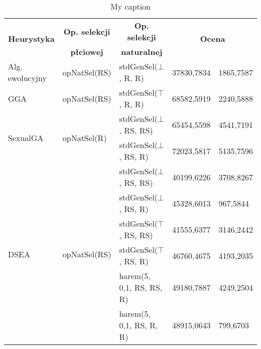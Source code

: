 \documentclass[./FM_mgr.tex]{subfiles}
\begin{document}
\begin{table}[h]
	\centering
	\caption{My caption}
	\label{my-label}
	\begin{tabular}{|l|l|l|r@{$\pm$}l|}
		\hline
		\multicolumn{1}{|c|}{\multirow{2}{*}{{\bf Heurystyka}}} & \multicolumn{1}{c|}{{\bf Op. selekcji}} & \multicolumn{1}{c|}{{\bf Op. selekcji}} & \multicolumn{2}{c|}{\multirow{2}{*}{{\bf Ocena}}} \\
		\multicolumn{1}{|c|}{}                                  & \multicolumn{1}{c|}{{\bf płciowej}}          & \multicolumn{1}{c|}{{\bf naturalnej}}        & \multicolumn{2}{c|}{}                             \\ \hline
		Alg. ewolucyjny                    & opNatSel(RS)                                          & stdGenSel($\bot$, R, R)                                 & 37830,7834      & 1865,7587      \\ \hline
		GGA                                    & opNatSel(RS)                                          & stdGenSel($\top$, R, R)                                 & 68582,5919      & 2240,5888      \\ \hline
		\multirow{2}{*}{SexualGA}              & \multirow{2}{*}{opNatSel(R)}                          & stdGenSel($\bot$, RS, RS)                               & 65454,5598      & 4541,7191      \\ \cline{3-5} 
		&                                                       & stdGenSel($\bot$, RS, R)                                & 72023,5817      & 5135,7596      \\ \hline
		\multirow{6}{*}{DSEA}                  & \multirow{6}{*}{opNatSel(RS)}                         & stdGenSel($\bot$, RS, RS)                               & 40199,6226      & 3708,8267      \\ \cline{3-5} 
		&                                                       & stdGenSel($\bot$, RS, R)                                & 45328,6013      & 967,5844       \\ \cline{3-5} 
		&                                                       & stdGenSel($\top$, RS, RS)                               & 41555,6377      & 3146,2442      \\ \cline{3-5} 
		&                                                       & stdGenSel($\top$, RS, R)                                & 46760,4675      & 4193,2035      \\ \cline{3-5} 
		&                                                       & harem(5, 0,1, RS, RS, R)                                & 49180,7887      & 4249,2504      \\ \cline{3-5} 
		&                                                       & harem(5, 0,1, RS, R, R)                                 & 48915,0643      & 799,6703       \\ \hline
	\end{tabular}
\end{table}
\end{document}
